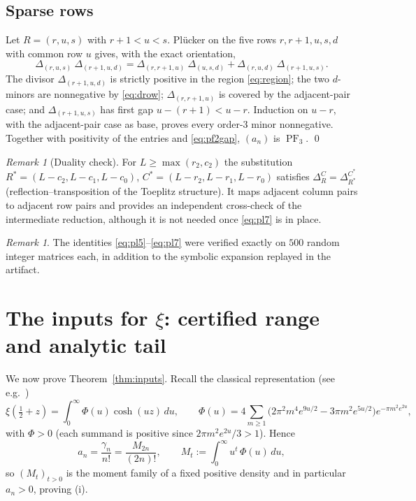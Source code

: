 \documentclass[11pt]{amsart}
\theoremstyle{definition}
\theoremstyle{remark}
\newtheorem{remark}[theorem]{Remark}
\DeclareMathOperator{\PF}{PF}
\newcommand{\minor}[2]{\Delta_{#1}^{#2}}
\begin{document}
\subsection{Sparse rows}
Let $R=(r,u,s)$ with $r+1<u<s$. Pl\"ucker on the five rows
$r,r+1,u,s,d$ with common row $u$ gives, with the exact orientation,
\begin{equation}\label{eq:pl7}
\minor{(r,u,s)}{}\ \minor{(r+1,u,d)}{}
= \minor{(r,r+1,u)}{}\ \minor{(u,s,d)}{}
+ \minor{(r,u,d)}{}\ \minor{(r+1,u,s)}{} .
\end{equation}
The divisor $\minor{(r+1,u,d)}{}$ is strictly positive in the region
\eqref{eq:region}; the two $d$-minors are nonnegative by
\eqref{eq:drow}; $\minor{(r,r+1,u)}{}$ is covered by the adjacent-pair
case; and $\minor{(r+1,u,s)}{}$ has first gap $u-(r+1)<u-r$. Induction
on $u-r$, with the adjacent-pair case as base, proves every order-$3$
minor nonnegative. Together with positivity of the entries and
\eqref{eq:pf2gap}, $(a_n)$ is $\PF_3$. \qed

\begin{remark}[Duality check]
For $L\ge\max(r_2,c_2)$ the substitution $R^*=(L-c_2,L-c_1,L-c_0)$,
$C^*=(L-r_2,L-r_1,L-r_0)$ satisfies
$\minor{R}{C}=\minor{R^*}{C^*}$ (reflection--transposition of the
Toeplitz structure). It maps adjacent column pairs to adjacent row
pairs and provides an independent cross-check of the intermediate
reduction, although it is not needed once \eqref{eq:pl7} is in place.
\end{remark}

\begin{remark}
The identities \eqref{eq:pl5}--\eqref{eq:pl7} were verified exactly on
$500$ random integer matrices each, in addition to the symbolic
expansion replayed in the artifact.
\end{remark}

\section{The inputs for \texorpdfstring{$\xi$}{xi}: certified range and analytic tail}
\label{sec:inputs}

We now prove Theorem~\ref{thm:inputs}. Recall the classical
representation (see e.g.\ \cite{PolyaCollected,CNV86})
\begin{equation}\label{eq:moment}
\xi(\tfrac12+z)=\int_0^\infty \Phi(u)\cosh(uz)\,du,
\qquad
\Phi(u)=4\sum_{m\ge1}\bigl(2\pi^2m^4e^{9u/2}-3\pi m^2e^{5u/2}\bigr)
e^{-\pi m^2 e^{2u}} ,
\end{equation}
with $\Phi>0$ (each summand is positive since
$2\pi m^2e^{2u}/3>1$). Hence
\begin{equation}\label{eq:an-moment}
a_n=\frac{\gamma_n}{n!}=\frac{M_{2n}}{(2n)!},
\qquad
M_t:=\int_0^\infty u^{t}\,\Phi(u)\,du ,
\end{equation}
so $(M_t)_{t>0}$ is the moment family of a fixed positive density and
in particular $a_n>0$, proving (i).
\end{document}
